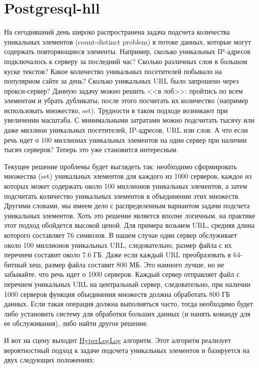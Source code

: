 \section{Postgresql-hll}

На сегодняшний день широко распространена задача подсчета количества уникальных элементов (count-distinct problem) в потоке данных, которые могут содержать повторяющиеся элементы. Например, сколько уникальных IP-адресов подключалось к серверу за последний час? Сколько различных слов в большом куске текстов? Какое количество уникальных посетителей побывало на популярном сайте за день? Сколько уникальных URL было запрошено через прокси-сервер? Данную задачу можно решить <<в лоб>>: пройтись по всем элементам и убрать дубликаты, после этого посчитать их количество (например использовать множество, set). Трудности в таком подходе возникают при увеличении масштаба. С минимальными затратами можно подсчитать тысячу или даже миллион уникальных посетителей, IP-адресов, URL или слов. А что если речь идет о 100 миллионах уникальных элементов на один сервер при наличии тысяч серверов? Теперь это уже становится интересным.

Текущее решение проблемы будет выглядеть так: необходимо сформировать множества (set) уникальных элементов для каждого из 1000 серверов, каждое из которых может содержать около 100 миллионов уникальных элементов, а затем подсчитать количество уникальных элементов в объединении этих множеств. Другими словами, мы имеем дело с распределенным вариантом задачи подсчета уникальных элементов. Хоть это решение является вполне логичным, на практике этот подход обойдется высокой ценой. Для примера возьмем URL, средняя длина которого составляет 76 символов. В нашем случае один сервер обслуживает около 100 миллионов уникальных URL, следовательно, размер файла с их перечнем составит около 7.6 ГБ. Даже если каждый URL преобразовать в 64-битный хеш, размер файла составит 800 МБ. Это намного лучше, но не забывайте, что речь идет о 1000 серверов. Каждый сервер отправляет файл с перечнем уникальных URL на центральный сервер, следовательно, при наличии 1000 серверов функция объединения множеств должна обработать 800 ГБ данных. Если такая операция должна выполняться часто, тогда необходимо будет либо установить систему для обработки больших данных (и нанять команду для ее обслуживания), либо найти другое решение.

И вот на сцену выходит \href{https://en.wikipedia.org/wiki/HyperLogLog}{HyperLogLog} алгоритм. Этот алгоритм реализует вероятностный подход к задаче подсчета уникальных элементов и базируется на двух следующих положениях:

